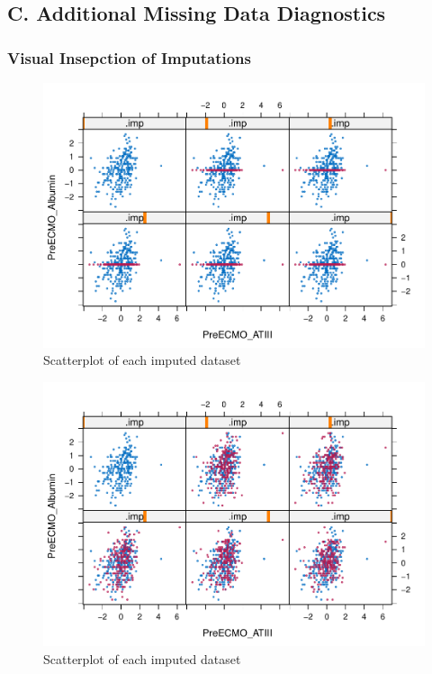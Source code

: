 \documentclass[12pt,]{article}
\newcommand{\appendixC}{ \setcounter{table}{0} \renewcommand{\thetable}{C\arabic{table}} \setcounter{figure}{0} \renewcommand{\thefigure}{C\arabic{figure}} }
\begin{document}
\subsection*{C. Additional Missing Data
Diagnostics}\label{c.-additional-missing-data-diagnostics}

\appendixC

\subsubsection{Visual Insepction of
Imputations}\label{visual-insepction-of-imputations}

\begin{figure}[H]

{\centering \includegraphics[width=1\linewidth]{figure/graphics-unnamed-chunk-13-1} 

}

\caption{\label{fig:xyplot-mean}Scatterplot of each imputed dataset}\label{fig:unnamed-chunk-13}
\end{figure}

\begin{figure}[H]

{\centering \includegraphics[width=1\linewidth]{figure/graphics-unnamed-chunk-14-1} 

}

\caption{\label{fig:xyplot-pmm}Scatterplot of each imputed dataset}\label{fig:unnamed-chunk-14}
\end{figure}
\end{document}
